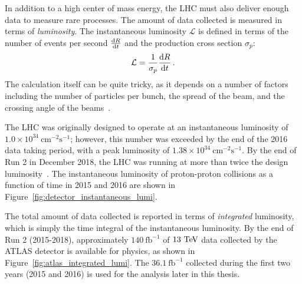In addition to a high center of mass energy, the LHC must also deliver enough data to measure rare processes.
The amount of data collected is measured in terms of \emph{luminosity}.
The instantaneous luminosity $\mathcal{L}$ is defined in terms of the number of events per second $\frac{\textrm{d}R}{\textrm{d}t}$ and the production cross section $\sigma_p$:
\begin{equation}
  \mathcal{L} = \frac{1}{\sigma_p}\deriv{R}{t}\,.
  \label{eq:inst_lumi}
\end{equation}
The calculation itself can be quite tricky, as it depends on a number of factors including the number of particles per bunch, the spread of the beam, and the crossing angle of the beams~\cite{2006.lumi}.

The LHC was originally designed to operate at an instantaneous luminosity of $1.0\times 10^{34}~\textrm{cm}^{-2}\textrm{s}^{-1}$; however, this number was exceeded by the end of the 2016 data taking period, with a peak luminosity of $1.38\times 10^{34}~\textrm{cm}^{-2}\textrm{s}^{-1}$.
By the end of Run 2 in December 2018, the LHC was running at more than twice the design luminosity~\cite{2019.atlas-lumi-plots}.
The instantaneous luminosity of proton-proton collisions as a function of time in 2015 and 2016 are shown in Figure~\ref{fig:detector_instantaneous_lumi}.

The total amount of data collected is reported in terms of \emph{integrated} luminosity, which is simply the time integral of the instantaneous luminosity.
By the end of Run 2 (2015-2018), approximately $140~\textrm{fb}^{-1}$ of $13\tev$ data collected by the ATLAS detector is available for physics, as shown in Figure~\ref{fig:atlas_integrated_lumi}.
The $36.1~\textrm{fb}^{-1}$ collected during the first two years (2015 and 2016) is used for the analysis later in this thesis.

